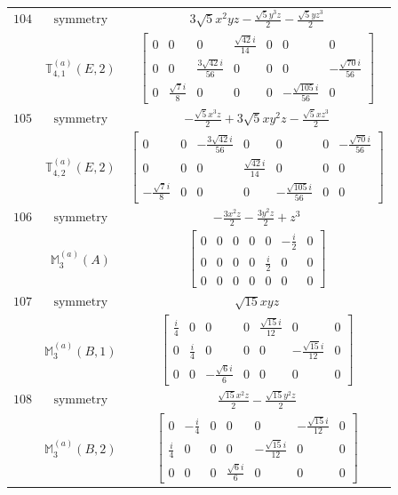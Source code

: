 \documentclass[fleqn,8pt,landscape]{jsarticle}
\begin{document}
\begin{longtable}{ccc}
$ 104 $ & $ \text{symmetry} $ & $ 3 \sqrt{5} x^{2} y z - \frac{\sqrt{5} y^{3} z}{2} - \frac{\sqrt{5} y z^{3}}{2} $ \\
$  $ & $ \mathbb{T}_{4,1}^{(a)}(E,2) $ & $ \begin{bmatrix} 0 & 0 & 0 & \frac{\sqrt{42} i}{14} & 0 & 0 & 0 \\ 0 & 0 & \frac{3 \sqrt{42} i}{56} & 0 & 0 & 0 & - \frac{\sqrt{70} i}{56} \\ 0 & \frac{\sqrt{7} i}{8} & 0 & 0 & 0 & - \frac{\sqrt{105} i}{56} & 0 \end{bmatrix} $ \\ \hline
$ 105 $ & $ \text{symmetry} $ & $ - \frac{\sqrt{5} x^{3} z}{2} + 3 \sqrt{5} x y^{2} z - \frac{\sqrt{5} x z^{3}}{2} $ \\
$  $ & $ \mathbb{T}_{4,2}^{(a)}(E,2) $ & $ \begin{bmatrix} 0 & 0 & - \frac{3 \sqrt{42} i}{56} & 0 & 0 & 0 & - \frac{\sqrt{70} i}{56} \\ 0 & 0 & 0 & \frac{\sqrt{42} i}{14} & 0 & 0 & 0 \\ - \frac{\sqrt{7} i}{8} & 0 & 0 & 0 & - \frac{\sqrt{105} i}{56} & 0 & 0 \end{bmatrix} $ \\ \hline
$ 106 $ & $ \text{symmetry} $ & $ - \frac{3 x^{2} z}{2} - \frac{3 y^{2} z}{2} + z^{3} $ \\
$  $ & $ \mathbb{M}_{3}^{(a)}(A) $ & $ \begin{bmatrix} 0 & 0 & 0 & 0 & 0 & - \frac{i}{2} & 0 \\ 0 & 0 & 0 & 0 & \frac{i}{2} & 0 & 0 \\ 0 & 0 & 0 & 0 & 0 & 0 & 0 \end{bmatrix} $ \\ \hline
$ 107 $ & $ \text{symmetry} $ & $ \sqrt{15} x y z $ \\
$  $ & $ \mathbb{M}_{3}^{(a)}(B,1) $ & $ \begin{bmatrix} \frac{i}{4} & 0 & 0 & 0 & \frac{\sqrt{15} i}{12} & 0 & 0 \\ 0 & \frac{i}{4} & 0 & 0 & 0 & - \frac{\sqrt{15} i}{12} & 0 \\ 0 & 0 & - \frac{\sqrt{6} i}{6} & 0 & 0 & 0 & 0 \end{bmatrix} $ \\ \hline
$ 108 $ & $ \text{symmetry} $ & $ \frac{\sqrt{15} x^{2} z}{2} - \frac{\sqrt{15} y^{2} z}{2} $ \\
$  $ & $ \mathbb{M}_{3}^{(a)}(B,2) $ & $ \begin{bmatrix} 0 & - \frac{i}{4} & 0 & 0 & 0 & - \frac{\sqrt{15} i}{12} & 0 \\ \frac{i}{4} & 0 & 0 & 0 & - \frac{\sqrt{15} i}{12} & 0 & 0 \\ 0 & 0 & 0 & \frac{\sqrt{6} i}{6} & 0 & 0 & 0 \end{bmatrix} $ \\ \hline

\end{longtable}
\end{document}

